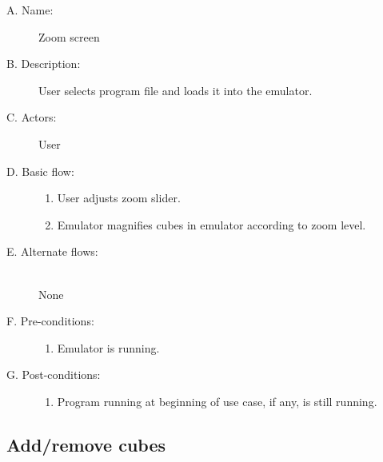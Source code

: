 \documentclass[12pt]{article}
\begin{document}
    \begin{description}
      \item[A. Name:] Zoom screen
      \item[B. Description:] User selects program file and loads it into the emulator.
      \item[C. Actors:] User
      \item[D. Basic flow:] \hfill
        \begin{enumerate}
	  \item{User adjusts zoom slider.}
	  \item{Emulator magnifies cubes in emulator according to zoom level.}
        \end{enumerate}
      \item[E. Alternate flows:] \hfill \\
	None
      \item[F. Pre-conditions:] \hfill
        \begin{enumerate}
          \item{Emulator is running.}
        \end{enumerate}
      \item[G. Post-conditions:] \hfill
        \begin{enumerate}
	  \item{Program running at beginning of use case, if any, is still running.}
        \end{enumerate}
    \end{description}	

  \subsection{Add/remove cubes}
\end{document}

